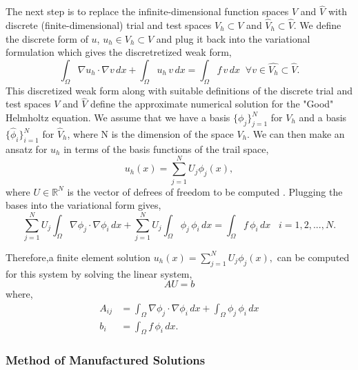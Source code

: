 \documentclass[]{article}
\begin{document}
The next step is to replace the infinite-dimensional function spaces $V$ and $\hat{V}$ with discrete (finite-dimensional) trial and test spaces $V_h \subset V$ and $\hat{V}_h \subset \hat{V}$.  We define the discrete form of $u$, $u_h \in V_h \subset V$ and plug it back into the variational formulation which gives the discretretized weak form,
\begin{equation}
\int_{\Omega} \nabla u_h \cdot \nabla v \, dx + \int_{\Omega} u_h \, v \, dx = \int_{\Omega} f \, v \, dx \;\; \forall v \in \hat{V_h} \subset \hat{V}.
\end{equation}
This discretized weak form along with suitable definitions of the discrete trial and test spaces $V$ and $\hat{V}$ define the approximate numerical solution for the "Good" Helmholtz equation.  We assume that we have a basis $\lbrace \phi_j \rbrace^N_{j=1}$ for $V_h$ and a basis $\lbrace \hat{\phi}_i\rbrace^N_{i=1}$ for $\hat{V}_h$, where N is the dimension of the space $V_h$.  We can then make an ansatz for $u_h$ in terms of the basis functions of the trail space,
\begin{equation}
u_h (x) = \sum^N_{j=1} U_j \phi_j(x),
\end{equation}
where $U \in \mathbb{R}^N$ is the vector of defrees of freedom to be computed \cite{AutomatedFEM2011}.  Plugging the bases into the variational form gives,
\begin{equation}
\sum^N_{j=1} U_j \int_{\Omega} \nabla \phi_j \cdot \nabla \phi_i \, dx + \sum^N_{j=1} U_j \int_{\Omega} \phi_j \, \phi_i \, dx = \int_{\Omega} f \, \phi_i \, dx \;\;\; i = 1,2,...,N.
\end{equation}

Therefore,a finite element solution $u_h (x) = \sum^N_{j=1} U_j \phi_j(x),$ can be computed for this system by solving the linear system,
\begin{equation}
A U = b
\end{equation}
where,
\begin{align}
A_{ij} &= \int_{\Omega} \nabla \phi_j \cdot \nabla \phi_i \, dx + \int_{\Omega} \phi_j \, \phi_i \, dx \\
b_i &= \int_{\Omega} f \, \phi_i \, dx.
\end{align}

\subsubsection{Method of Manufactured Solutions}
\end{document}
